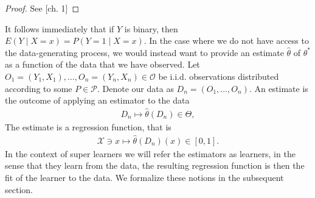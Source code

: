 \documentclass[11pt, a4paper]{article}
\theoremstyle{definition}
\theoremstyle{remark}
\newcommand{\btheta}{\theta}
\begin{document}
\begin{proof}
    See \cite{gyorfi2002distribution}[ch. 1]
\end{proof}
It follows immediately that if $ Y $ is binary, then $ E(Y \mid X = x) = P(Y = 1 \mid X = x) $.  
In the case where we do not have access to the data-generating process, we would instead want to provide an estimate $ \hat{\btheta} $ of $ \btheta^*$ as a function of the data that we have observed. Let $ O_1 = (Y_1 , X_1) ,\ldots, O_n = (Y_n , X_n) \in  \mathcal{O} $ be i.i.d. observations distributed according to some $ P \in \mathcal{P} $. Denote our data as $ D_n = (O_1, \dots , O_n)$. An estimate is the outcome of applying an estimator to the data 
\begin{align*}
    D_n \mapsto \hat{\btheta}(D_n) \in \Theta,   
\end{align*}
The estimate is a regression function, that is 
\begin{align*}
    \mathcal{X} \ni x \mapsto \hat{\btheta}(D_n)(x) \in [0,1].
\end{align*}
In the context of super learners we will refer the estimators as learners, in the sense that they learn from the data, the resulting regression function is then the fit of the learner to the data. We formalize these notions in the subsequent section. 
\end{document}
